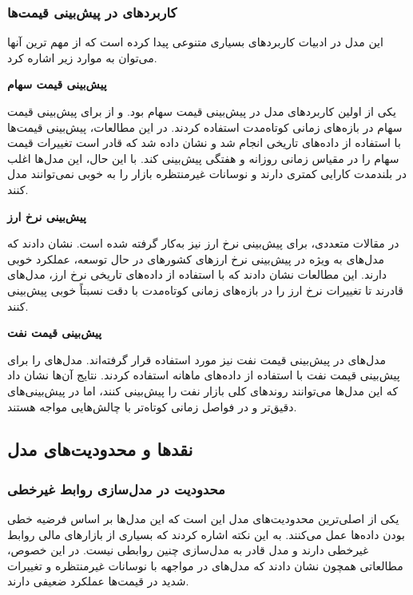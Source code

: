 \subsubsection{کاربردهای  در پیش‌بینی قیمت‌ها}
این مدل در ادبیات کاربرد‌های بسیاری متنوعی پیدا کرده است که از مهم ترین آنها می‌توان به موارد زیر اشاره کرد.

\textbf{پیش‌بینی قیمت سهام}


یکی از اولین کاربردهای مدل  در پیش‌بینی قیمت سهام بود. \cite{box1976time} و \cite{weigend1991predicting} از  برای پیش‌بینی قیمت سهام در بازه‌های زمانی کوتاه‌مدت استفاده کردند. در این مطالعات، پیش‌بینی قیمت‌ها با استفاده از داده‌های تاریخی انجام شد و نشان داده شد که  قادر است تغییرات قیمت سهام را در مقیاس زمانی روزانه و هفتگی پیش‌بینی کند. با این حال، این مدل‌ها اغلب در بلندمدت کارایی کمتری دارند و نوسانات غیرمنتظره بازار را به خوبی نمی‌توانند مدل کنند.

\textbf{پیش‌بینی نرخ ارز}

در مقالات متعددی،  برای پیش‌بینی نرخ ارز نیز به‌کار گرفته شده است. \cite{tsay2005analysis}  نشان دادند که مدل‌های  به ویژه در پیش‌بینی نرخ ارزهای کشورهای در حال توسعه، عملکرد خوبی دارند. این مطالعات نشان دادند که با استفاده از داده‌های تاریخی نرخ ارز، مدل‌های  قادرند  تا تغییرات نرخ ارز را در بازه‌های زمانی کوتاه‌مدت با دقت نسبتاً خوبی پیش‌بینی کنند.

\textbf{پیش‌بینی قیمت نفت}

مدل‌های  در پیش‌بینی قیمت نفت نیز مورد استفاده قرار گرفته‌اند. \cite{zhang2008forecasting} مدل‌های  را برای پیش‌بینی قیمت نفت با استفاده از داده‌های ماهانه استفاده کردند. نتایج آن‌ها نشان داد که این مدل‌ها می‌توانند روندهای کلی بازار نفت را پیش‌بینی کنند، اما در پیش‌بینی‌های دقیق‌تر و در فواصل زمانی کوتاه‌تر با چالش‌هایی مواجه هستند.

\subsection{نقدها و محدودیت‌های مدل }

\subsubsection{محدودیت‌ در مدل‌سازی روابط غیرخطی}
یکی از اصلی‌ترین محدودیت‌های مدل  این است که این مدل‌ها بر اساس فرضیه خطی بودن داده‌ها عمل می‌کنند. \cite{lo1997market} به این نکته اشاره کردند که بسیاری از بازارهای مالی روابط غیرخطی دارند و مدل  قادر به مدل‌سازی چنین روابطی نیست. در این خصوص، مطالعاتی همچون \cite{anderson1998forecasting} نشان دادند که مدل‌های  در مواجهه با نوسانات غیرمنتظره و تغییرات شدید در قیمت‌ها عملکرد ضعیفی دارند.

